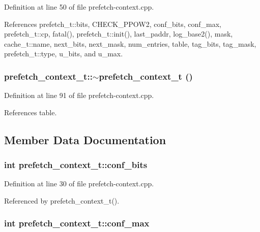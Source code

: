 Definition at line 50 of file prefetch-context.cpp.

References prefetch\_\-t::bits, CHECK\_\-PPOW2, conf\_\-bits, conf\_\-max, prefetch\_\-t::cp, fatal(), prefetch\_\-t::init(), last\_\-paddr, log\_\-base2(), mask, cache\_\-t::name, next\_\-bits, next\_\-mask, num\_\-entries, table, tag\_\-bits, tag\_\-mask, prefetch\_\-t::type, u\_\-bits, and u\_\-max.
\subsubsection[{$\sim$prefetch\_\-context\_\-t}]{\setlength{\rightskip}{0pt plus 5cm}prefetch\_\-context\_\-t::$\sim$prefetch\_\-context\_\-t ()\hspace{0.3cm}{\tt  [inline]}}\label{classprefetch__context__t_a09d2e4abb8821736d764c2f8bcabeaf}




Definition at line 91 of file prefetch-context.cpp.

References table.

\subsection{Member Data Documentation}
\subsubsection[{conf\_\-bits}]{\setlength{\rightskip}{0pt plus 5cm}int {\bf prefetch\_\-context\_\-t::conf\_\-bits}\hspace{0.3cm}{\tt  [protected]}}\label{classprefetch__context__t_4ab2a40424f7bf711d2e02c66632ed5e}




Definition at line 30 of file prefetch-context.cpp.

Referenced by prefetch\_\-context\_\-t().
\subsubsection[{conf\_\-max}]{\setlength{\rightskip}{0pt plus 5cm}int {\bf prefetch\_\-context\_\-t::conf\_\-max}\hspace{0.3cm}{\tt  [protected]}}\label{classprefetch__context__t_e8834f83c7052d436a5878c3ffc39b9e}




